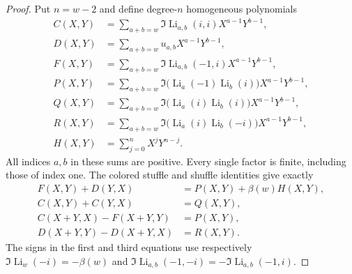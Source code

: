 \begin{proof}
Put $n=w-2$ and define degree-$n$ homogeneous polynomials
\begin{align*}
 C(X,Y)&=\sum_{a+b=w}\Im\operatorname{Li}_{a,b}(i,i)X^{a-1}Y^{b-1},\\
 D(X,Y)&=\sum_{a+b=w}u_{a,b}X^{a-1}Y^{b-1},\\
 F(X,Y)&=\sum_{a+b=w}\Im\operatorname{Li}_{a,b}(-1,i)X^{a-1}Y^{b-1},\\
 P(X,Y)&=\sum_{a+b=w}\Im\bigl(\operatorname{Li}_a(-1)
                         \operatorname{Li}_b(i)\bigr)X^{a-1}Y^{b-1},\\
 Q(X,Y)&=\sum_{a+b=w}\Im\bigl(\operatorname{Li}_a(i)
                         \operatorname{Li}_b(i)\bigr)X^{a-1}Y^{b-1},\\
 R(X,Y)&=\sum_{a+b=w}\Im\bigl(\operatorname{Li}_a(i)
                         \operatorname{Li}_b(-i)\bigr)X^{a-1}Y^{b-1},\\
 H(X,Y)&=\sum_{j=0}^{n}X^jY^{n-j}.
\end{align*}
All indices $a,b$ in these sums are positive.  Every single factor is
finite, including those of index one.  The colored stuffle and shuffle
identities give exactly
\begin{align}
 F(X,Y)+D(Y,X)&=P(X,Y)+\beta(w)H(X,Y),\label{newmixed:eq:SFD}\\
 C(X,Y)+C(Y,X)&=Q(X,Y),\label{newmixed:eq:SCC}\\
 C(X+Y,X)-F(X+Y,Y)&=P(X,Y),\label{newmixed:eq:HCF}\\
 D(X+Y,Y)-D(X+Y,X)&=R(X,Y).\label{newmixed:eq:HDD}
\end{align}
The signs in the first and third equations use respectively
$\Im\operatorname{Li}_w(-i)=-\beta(w)$ and
$\Im\operatorname{Li}_{a,b}(-1,-i)
=-\Im\operatorname{Li}_{a,b}(-1,i)$.


\end{proof}
